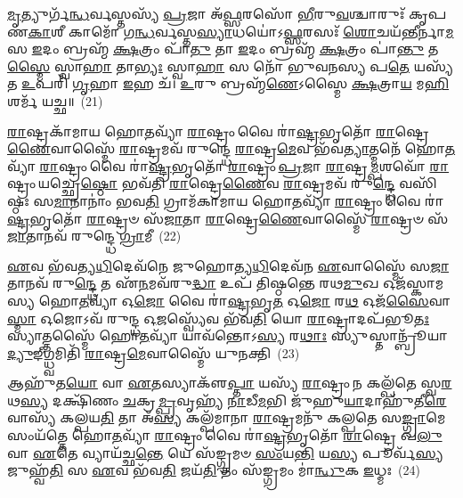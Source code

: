 \-\ul{𑌮𑍃}\-𑌤𑍍𑌯𑍁𑌰𑍍𑌗᳴\-\ul{𑌨𑍍𑌧}\-𑌰𑍍𑌵𑌸𑍍𑌤𑌸𑍍𑌯᳴ \ul{𑌪𑍍𑌰}\-𑌜𑌾 𑌅᳴\-\ul{𑌫𑍍𑌸}\-𑌰𑌸𑍋᳴ \ul{𑌭𑍀}\-𑌰𑍁\-\ul{𑌵}\-𑌶𑍍𑌚𑌾𑌰𑍁𑌃᳴ 𑌕𑍃𑌪𑌣\-\ul{𑌕𑌾}\-𑌶𑍀 𑌕𑌾𑌮𑍋᳴ 𑌗\-\ul{𑌨𑍍𑌧}\-𑌰𑍍𑌵𑌸𑍍𑌤\-\ul{𑌸𑍍𑌯𑌾}\-𑌧𑌯𑍋॑\-𑌽\-\ul{𑌫𑍍𑌸}\-𑌰𑌸𑌃᳴ \ul{𑌶𑍋}\-𑌚𑌯᳴\-\ul{𑌨𑍍𑌤𑍀}\-𑌰𑍍𑌨𑌾\-\ul{𑌮} 𑌸 \ul{𑌇}\-𑌦𑌂 𑌬𑍍𑌰𑌹𑍍𑌮᳴ \ul{𑌕𑍍𑌷}\-𑌤𑍍𑌰𑌂 𑌪𑌾᳴\-\ul{𑌤𑍁} 𑌤𑌾 \ul{𑌇}\-𑌦𑌂 𑌬𑍍𑌰𑌹𑍍𑌮᳴ \ul{𑌕𑍍𑌷}\-𑌤𑍍𑌰𑌂 𑌪𑌾॑\-\ul{𑌨𑍍𑌤𑍁} 𑌤\-\ul{𑌸𑍍𑌮𑍈} 𑌸𑍍𑌵𑌾\-\ul{𑌹𑌾} 𑌤𑌾\-\ul{𑌭𑍍𑌯𑌃} 𑌸𑍍𑌵𑌾\-\ul{𑌹𑌾} 𑌸 𑌨𑍋᳴ 𑌭𑍁𑌵𑌨𑌸𑍍𑌯 𑌪\-\ul{𑌤𑍇} 𑌯𑌸𑍍𑌯᳴ 𑌤 \ul{𑌉}\-𑌪𑌰𑌿᳴ \ul{𑌗𑍃}\-𑌹𑌾 \ul{𑌇}\-𑌹 𑌚᳴। \ul{𑌉}\-𑌰𑍁 𑌬𑍍𑌰𑌹𑍍𑌮᳴\-\ul{𑌣𑍇}\-\-𑌽𑌸𑍍𑌮𑍈 \ul{𑌕𑍍𑌷}\-𑌤𑍍𑌰𑌾\-\ul{𑌯} 𑌮\-\ul{𑌹𑌿} 𑌶𑌰𑍍𑌮᳴ 𑌯𑌚𑍍𑌛॥~(21)

{\anuvakamend[{𑌮𑌨𑍋᳴\-𑌽𑌮𑍃\-\ul{𑌡}\-𑌯𑌃 𑌷𑌟𑍍𑌚᳴𑌤𑍍𑌵𑌾𑌰𑌿𑍞𑌶𑌚𑍍𑌚}]}%

\-\ul{𑌰𑌾}\-𑌷𑍍𑌟𑍍𑌰𑌕𑌾᳴𑌮𑌾𑌯 𑌹𑍋\-\ul{𑌤}\-𑌵𑍍𑌯𑌾᳴ \ul{𑌰𑌾}\-𑌷𑍍𑌟𑍍𑌰𑌂 𑌵𑍈 𑌰𑌾॑\-\ul{𑌷𑍍𑌟𑍍𑌰}\-𑌭𑍃𑌤𑍋᳴ \ul{𑌰𑌾}\-𑌷𑍍𑌟𑍍𑌰𑍇\-\ul{𑌣𑍈}\-𑌵𑌾𑌸𑍍𑌮𑍈᳴ \ul{𑌰𑌾}\-𑌷𑍍𑌟𑍍𑌰𑌮𑌵᳴ 𑌰𑍁𑌨𑍍𑌦𑍍𑌧𑍇 \ul{𑌰𑌾}\-𑌷𑍍𑌟𑍍𑌰\-\ul{𑌮𑍇}\-𑌵 𑌭᳴𑌵\-\ul{𑌤𑍍𑌯𑌾}\-𑌤𑍍𑌮𑌨𑍇᳴ 𑌹𑍋\-\ul{𑌤}\-𑌵𑍍𑌯𑌾᳴ \ul{𑌰𑌾}\-𑌷𑍍𑌟𑍍𑌰𑌂 𑌵𑍈 𑌰𑌾॑\-\ul{𑌷𑍍𑌟𑍍𑌰}\-𑌭𑍃𑌤𑍋᳴ \ul{𑌰𑌾}\-𑌷𑍍𑌟𑍍𑌰𑌂 \ul{𑌪𑍍𑌰}\-𑌜𑌾 \ul{𑌰𑌾}\-𑌷𑍍𑌟𑍍𑌰\-\ul{𑌮𑍍𑌪}\-𑌶𑌵𑍋᳴ \ul{𑌰𑌾}\-𑌷𑍍𑌟𑍍𑌰𑌂 𑌯𑌚𑍍𑌛𑍍𑌰𑍇\-\ul{𑌷𑍍𑌠𑍋} 𑌭𑌵᳴𑌤𑌿 \ul{𑌰𑌾}\-𑌷𑍍𑌟𑍍𑌰𑍇\-\ul{𑌣𑍈}\-𑌵 \ul{𑌰𑌾}\-𑌷𑍍𑌟𑍍𑌰𑌮𑌵᳴ 𑌰𑍁\-\ul{𑌨𑍍𑌦𑍍𑌧𑍇} 𑌵𑌸𑌿᳴𑌷𑍍𑌠𑌃 𑌸\-\ul{𑌮𑌾}\-𑌨𑌾𑌨𑌾𑌂॑ 𑌭𑌵\-\ul{𑌤𑌿} 𑌗𑍍𑌰𑌾𑌮᳴𑌕𑌾𑌮𑌾𑌯 𑌹𑍋\-\ul{𑌤}\-𑌵𑍍𑌯𑌾᳴ \ul{𑌰𑌾}\-𑌷𑍍𑌟𑍍𑌰𑌂 𑌵𑍈 𑌰𑌾॑\-\ul{𑌷𑍍𑌟𑍍𑌰}\-𑌭𑍃𑌤𑍋᳴ \ul{𑌰𑌾}\-𑌷𑍍𑌟𑍍𑌰𑍞 𑌸᳴\-\ul{𑌜𑌾}\-𑌤𑌾 \ul{𑌰𑌾}\-𑌷𑍍𑌟𑍍𑌰𑍇\-\ul{𑌣𑍈}\-𑌵𑌾𑌸𑍍𑌮𑍈᳴ \ul{𑌰𑌾}\-𑌷𑍍𑌟𑍍𑌰𑍞 𑌸᳴\-\ul{𑌜𑌾}\-𑌤𑌾𑌨𑌵᳴ 𑌰𑍁𑌨𑍍𑌦𑍍𑌧𑍇 \ul{𑌗𑍍𑌰𑌾}\-𑌮𑍀~(22)

\-\ul{𑌏}\-𑌵 𑌭᳴𑌵𑌤𑍍𑌯\-\ul{𑌧𑌿}\-𑌦𑍇𑌵᳴𑌨𑍇 𑌜𑍁𑌹𑍋𑌤𑍍𑌯\-\ul{𑌧𑌿}\-𑌦𑍇𑌵᳴𑌨 \ul{𑌏}\-𑌵𑌾𑌸𑍍𑌮𑍈᳴ 𑌸\-\ul{𑌜𑌾}\-𑌤𑌾𑌨𑌵᳴ 𑌰𑍁\-\ul{𑌨𑍍𑌦𑍍𑌧𑍇} 𑌤 𑌏᳴\-\ul{𑌨}\-𑌮𑌵᳴𑌰𑍁\-\ul{𑌦𑍍𑌧𑌾} 𑌉𑌪᳴ 𑌤𑌿𑌷𑍍𑌠𑌨𑍍𑌤𑍇 𑌰𑌥\-\ul{𑌮𑍁}\-𑌖 𑌓𑌜᳴𑌸𑍍𑌕𑌾𑌮𑌸𑍍𑌯 𑌹𑍋\-\ul{𑌤}\-𑌵𑍍𑌯𑌾᳴ 𑌓\-\ul{𑌜𑍋} 𑌵𑍈 𑌰𑌾॑\-\ul{𑌷𑍍𑌟𑍍𑌰}\-𑌭𑍃\-\ul{𑌤} 𑌓\-\ul{𑌜𑍋} 𑌰\-\ul{𑌥} 𑌓𑌜᳴\-\ul{𑌸𑍈}\-𑌵𑌾\-\ul{𑌸𑍍𑌮𑌾} 𑌓𑌜𑍋\-𑌽𑌵᳴ 𑌰𑍁𑌨𑍍𑌦𑍍𑌧 𑌓\-\ul{𑌜}\-𑌸𑍍𑌵𑍍𑌯𑍇᳴𑌵 𑌭᳴𑌵\-\ul{𑌤𑌿} 𑌯𑍋 \ul{𑌰𑌾}\-𑌷𑍍𑌟𑍍𑌰𑌾𑌦𑌪᳴𑌭𑍂\-\ul{𑌤𑌃} 𑌸𑍍𑌯𑌾𑌤𑍍𑌤𑌸𑍍𑌮𑍈᳴ 𑌹𑍋\-\ul{𑌤}\-𑌵𑍍𑌯𑌾᳴ 𑌯𑌾𑌵᳴𑌨𑍍𑌤𑍋\-𑌽\-\ul{𑌸𑍍𑌯} 𑌰\-\ul{𑌥𑌾𑌃} 𑌸𑍍𑌯𑍁𑌸𑍍𑌤𑌾𑌨𑍍𑌬𑍍𑌰𑍂᳴𑌯𑌾\-\ul{𑌦𑍍𑌯𑍁}\-𑌙𑍍𑌗𑍍𑌧𑍍𑌵𑌮𑌿𑌤𑌿᳴ \ul{𑌰𑌾}\-𑌷𑍍𑌟𑍍𑌰\-\ul{𑌮𑍇}\-𑌵𑌾𑌸𑍍𑌮𑍈᳴ 𑌯𑍁𑌨𑌕𑍍𑌤𑌿~(23)

𑌆𑌹𑍁᳴𑌤\-\ul{𑌯𑍋} 𑌵𑌾 \ul{𑌏}\-𑌤𑌸𑍍𑌯𑌾𑌕𑍢᳴\-\ul{𑌪𑍍𑌤𑌾} 𑌯𑌸𑍍𑌯᳴ \ul{𑌰𑌾}\-𑌷𑍍𑌟𑍍𑌰𑌂 𑌨 𑌕𑌲𑍍𑌪᳴𑌤𑍇 𑌸𑍍𑌵\-\ul{𑌰}\-𑌥\-\ul{𑌸𑍍𑌯} 𑌦𑌕𑍍𑌷𑌿᳴𑌣𑌂 \ul{𑌚}\-𑌕𑍍𑌰\-\ul{𑌮𑍍𑌪𑍍𑌰}\-𑌵𑍃𑌹𑍍𑌯᳴ \ul{𑌨𑌾}\-𑌡𑍀\-\ul{𑌮}\-𑌭𑌿 𑌜𑍁᳴𑌹𑍁\-\ul{𑌯𑌾}\-𑌦𑌾𑌹𑍁᳴𑌤𑍀\-\ul{𑌰𑍇}\-𑌵𑌾𑌸𑍍𑌯᳴ 𑌕𑌲𑍍𑌪𑌯\-\ul{𑌤𑌿} 𑌤𑌾 𑌅᳴\-\ul{𑌸𑍍𑌯} 𑌕𑌲𑍍𑌪᳴𑌮𑌾𑌨𑌾 \ul{𑌰𑌾}\-𑌷𑍍𑌟𑍍𑌰𑌮𑌨𑍁᳴ 𑌕𑌲𑍍𑌪𑌤𑍇 𑌸\-\ul{𑌙𑍍𑌗𑍍𑌰𑌾}\-𑌮𑍇 𑌸𑌂𑌯᳴𑌤𑍍𑌤𑍇 𑌹𑍋\-\ul{𑌤}\-𑌵𑍍𑌯𑌾᳴ \ul{𑌰𑌾}\-𑌷𑍍𑌟𑍍𑌰𑌂 𑌵𑍈 𑌰𑌾॑\-\ul{𑌷𑍍𑌟𑍍𑌰}\-𑌭𑍃𑌤𑍋᳴ \ul{𑌰𑌾}\-𑌷𑍍𑌟𑍍𑌰𑍇 𑌖\-\ul{𑌲𑍁} 𑌵𑌾 \ul{𑌏}\-𑌤𑍇 𑌵𑍍𑌯𑌾𑌯᳴𑌚𑍍𑌛\-\ul{𑌨𑍍𑌤𑍇} 𑌯𑍇 𑌸᳴𑌙𑍍𑌗𑍍𑌰𑌮𑍞 \ul{𑌸𑌂}\-𑌯\-\ul{𑌨𑍍𑌤𑌿} 𑌯\-\ul{𑌸𑍍𑌯} 𑌪𑍂𑌰𑍍𑌵᳴\-\ul{𑌸𑍍𑌯} 𑌜𑍁𑌹𑍍𑌵᳴\-\ul{𑌤𑌿} 𑌸 \ul{𑌏}\-𑌵 𑌭᳴𑌵\-\ul{𑌤𑌿} 𑌜𑌯᳴\-\ul{𑌤𑌿} 𑌤𑌂 𑌸᳴𑌙𑍍𑌗𑍍𑌰𑌮𑌂 𑌮𑌾॑\-\ul{𑌨𑍍𑌧𑍁}\-𑌕 \ul{𑌇}\-𑌧𑍍𑌮𑌃~(24)

